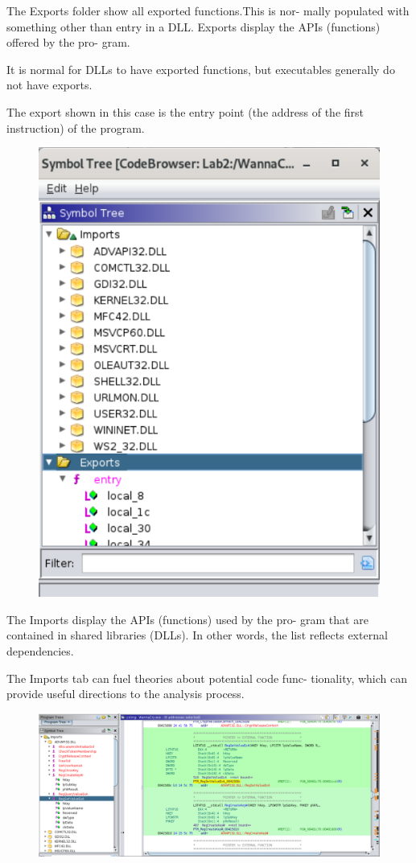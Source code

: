 \documentclass[]{project_plan}
\begin{document}
The Exports folder show all exported functions.This is nor-
mally populated with something other than entry in a DLL.
Exports display the APIs (functions) offered by the pro-
gram.

It is normal for DLLs to have exported functions,
but executables generally do not have exports.

The export
shown in this case is the entry point (the address of the first
instruction) of the program.

\begin{figure}[H]
  \centering
  \includegraphics[width=.5\linewidth]{lab2 ghidra imports.png}
\end{figure}

The Imports display the APIs (functions) used by the pro-
gram that are contained in shared libraries (DLLs).
In
other words, the list reflects external dependencies.

The
Imports tab can fuel theories about potential code func-
tionality, which can provide useful directions to the analysis
process.

\begin{figure}[H]
  \centering
  \includegraphics[width=\linewidth]{lab2 ghidra reg api.png}
\end{figure}
\end{document}
